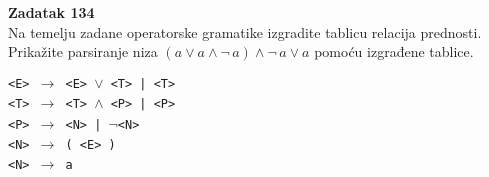 \documentclass[12pt]{article}
\newenvironment{problem}[2][Zadatak]
    { \begin{mdframed}[backgroundcolor=lightgray] \textbf{#1 #2} \\}
    {  \end{mdframed}}
\begin{document}
\newpage

\begin{problem}{134}
    Na temelju zadane operatorske gramatike izgradite tablicu relacija prednosti. Prikažite parsiranje niza $(a \vee a \wedge \neg \,a) \wedge  \neg \,a \vee a$ pomoću izgrađene tablice. 
    
    \noindent \texttt{<E> $\xrightarrow[]{}$ <E> $\vee$ <T> | <T>}\\
    \texttt{<T> $\xrightarrow[]{}$ <T> $\wedge$ <P> | <P>}\\
    \texttt{<P> $\xrightarrow[]{}$ <N> | $\neg$<N>}\\
    \texttt{<N> $\xrightarrow[]{}$ ( <E> )}\\
    \texttt{<N> $\xrightarrow[]{}$ a}
\end{problem}
\end{document}
